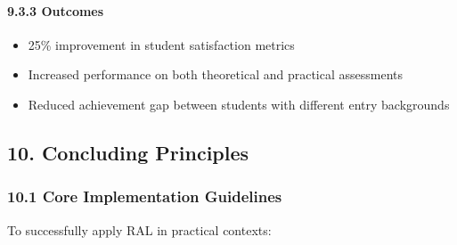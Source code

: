 \documentclass[
]{article}
\providecommand{\tightlist}{%
  \setlength{\itemsep}{0pt}\setlength{\parskip}{0pt}}
\begin{document}
\paragraph{9.3.3 Outcomes}\label{outcomes-2}

\begin{itemize}
\tightlist
\item
  25\% improvement in student satisfaction metrics
\item
  Increased performance on both theoretical and practical assessments
\item
  Reduced achievement gap between students with different entry
  backgrounds
\end{itemize}

\subsection{10. Concluding Principles}\label{concluding-principles}

\subsubsection{10.1 Core Implementation
Guidelines}\label{core-implementation-guidelines}

To successfully apply RAL in practical contexts:
\end{document}
